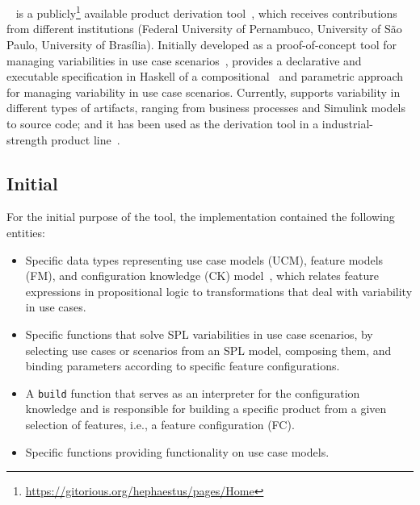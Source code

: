 
\section{\hp}
\label{sec:hephaestus}

\hp~\cite{rbonifacio:sbcars2009} is a
publicly\footnote{\url{https://gitorious.org/hephaestus/pages/Home}}
available product derivation tool~\cite{deelstra:2005}, which receives
contributions from different institutions (Federal University of
Pernambuco, University of S\~{a}o Paulo, University of
Bras\'{i}lia). Initially developed as a proof-of-concept tool for
managing variabilities in use case
scenarios~\cite{rbonifacio:aosd2009}, \hp{} provides a declarative and
executable specification in Haskell of a
compositional~\cite{kastner:2008} and parametric approach for managing
variability in use case scenarios.  Currently, \hp{} supports
variability in different types of artifacts, ranging from business
processes and Simulink models to source code; and it has been used as
the derivation tool in a industrial-strength product
line~\cite{ferreira:2010}.


\subsection{Initial \hp}
\label{sec:initial-hp}

For the initial purpose of the tool, the implementation contained the
following entities:

\begin{itemize}
\item Specific data types representing use case models (UCM), feature
  models (FM), and configuration knowledge (CK) model~\cite{gpbook},
  which relates feature expressions in propositional logic to
  transformations that deal with variability in use cases.

\item Specific functions that solve SPL variabilities in use case
  scenarios, by selecting use cases or scenarios from an SPL model,
  composing them, and binding parameters according to specific feature
  configurations.

\item A \texttt{build} function that serves as an interpreter for the
  configuration knowledge and is responsible for building a specific
  product from a given selection of features, i.e., a feature
  configuration (FC).

\item Specific functions providing functionality on use case models.

\end{itemize}

